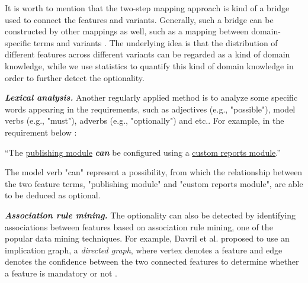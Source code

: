 \documentclass[graybox]{svmult}
\begin{document}
It is worth to mention that the two-step mapping approach is kind of a bridge used to connect the features and variants. Generally, such a bridge can be constructed by other mappings as well, such as a mapping between domain-specific terms and variants \cite{FerrariSD13}. 
The underlying idea is that the distribution of different features across different variants can be regarded as a kind of domain knowledge, while we use statistics to quantify this kind of domain knowledge in order to further detect the optionality.


\textit{\textbf{Lexical analysis.}} Another regularly applied method is to analyze some specific words appearing in the requirements, such as adjectives (e.g., "possible"), model verbs (e.g., "must"), adverbs (e.g., "optionally") and etc.. 
For example, in the requirement below \cite{Sree-KumarPC18}:

\vspace{2mm}
\begin{mdframed}[style=mystyle]
``The \uline{publishing module} \textit{\textbf{can}} be configured using a \uline{custom reports module}.'' 
\end{mdframed}
\vspace{4mm}

The model verb "can" represent a possibility, from which the relationship between the two feature terms, "publishing module" and "custom reports module", are able to be deduced as optional.



\textit{\textbf{Association rule mining.}} The optionality can also be detected by identifying associations between features based on association rule mining, one of the popular data mining techniques. For example, Davril et al. proposed to use an implication graph, a \textit{directed graph}, where vertex denotes a feature and edge denotes the confidence between the two connected features to determine whether a feature is mandatory or not \cite{DavrilDHACH13}.
\end{document}
